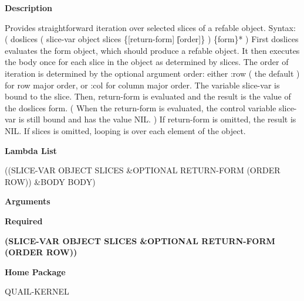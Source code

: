  
{\bf Description}

Provides straightforward iteration over selected slices of a refable object. Syntax: ( doslices ( slice-var object slices \{[return-form] \| [order]\} ) \{form\}* ) First doslices evaluates the form object, which should produce a refable object. It then executes the body once for each slice in the object as determined by slices. The order of iteration is determined by the optional argument order: either :row ( the default ) for row major order, or :col for column major order. The variable slice-var is bound to the slice. Then, return-form is evaluated and the result is the value of the doslices form. ( When the return-form is evaluated, the control variable slice-var is still bound and has the value NIL. ) If return-form is omitted, the result is NIL. If slices is omitted, looping is over each element of the object.

 
{\bf Lambda List}

((SLICE-VAR OBJECT SLICES \&OPTIONAL RETURN-FORM (ORDER ROW)) \&BODY BODY)

 
{\bf Arguments}


\beginhang
{\bf Required}\hspace{2em}
 
{\bf (SLICE-VAR OBJECT SLICES \&OPTIONAL RETURN-FORM (ORDER ROW))}


 
\endhang
 
{\bf Home Package}

QUAIL-KERNEL

